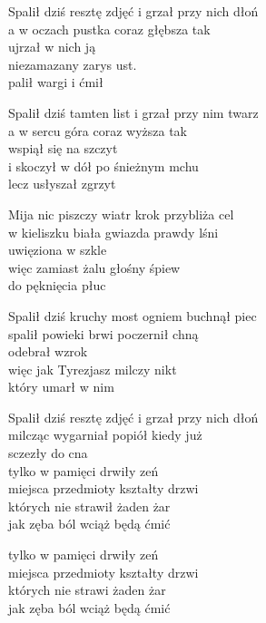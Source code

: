 \begin{text}
    Spalił dziś resztę zdjęć i grzał przy nich dłoń\\
    a w oczach pustka coraz głębsza tak\\
    ujrzał w nich ją\\
    niezamazany zarys ust.\\
    palił wargi i ćmił

    Spalił dziś tamten list i grzał przy nim twarz\\
    a w sercu góra coraz wyższa tak\\
    wspiął się na szczyt\\
    i skoczył w dół po śnieżnym mchu\\
    lecz usłyszał zgrzyt

    Mija nic piszczy wiatr krok przybliża cel\\
    w kieliszku biała gwiazda prawdy lśni\\
    uwięziona w szkle\\
    więc zamiast żalu głośny śpiew\\
    do pęknięcia płuc

    Spalił dziś kruchy most ogniem buchnął piec\\
    spalił powieki brwi poczernił chną\\
    odebrał wzrok\\
    więc jak Tyrezjasz milczy nikt\\
    który umarł w nim

    Spalił dziś resztę zdjęć i grzał przy nich dłoń\\
    milcząc wygarniał popiół kiedy już\\
    sczezły do cna\\
    tylko w pamięci drwiły zeń\\
    miejsca przedmioty kształty drzwi\\
    których nie strawił żaden żar\\
    jak zęba ból wciąż będą ćmić

    tylko w pamięci drwiły zeń\\
    miejsca przedmioty kształty drzwi\\
    których nie strawi żaden żar\\
    jak zęba ból wciąż będą ćmić
\end{text}
\begin{chord}

\end{chord}
